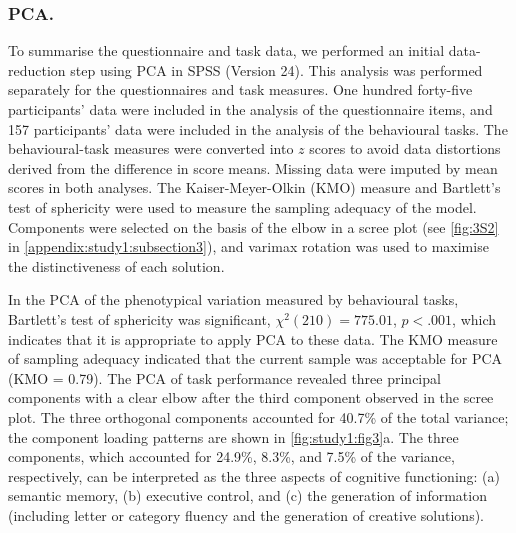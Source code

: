 \subsubsection{PCA.}
To summarise the questionnaire and task data, we performed an initial data-reduction step using PCA in SPSS (Version 24). This analysis was performed separately for the questionnaires and task measures. One hundred forty-five participants’ data were included in the analysis of the questionnaire items, and 157 participants’ data were included in the analysis of the behavioural tasks. The behavioural-task measures were converted into \(\mathit{z}\) scores to avoid data distortions derived from the difference in score means. Missing data were imputed by mean scores in both analyses. The Kaiser-Meyer-Olkin (KMO) measure and Bartlett’s test of sphericity were used to measure the sampling adequacy of the model. Components were selected on the basis of the elbow in a scree plot (see \cref{fig:3S2} in \cref{appendix:study1:subsection3}), and varimax rotation was used to maximise the distinctiveness of each solution.

In the PCA of the phenotypical variation measured by behavioural tasks, Bartlett’s test of sphericity was significant,
\(\chi^{2}(210) = 775.01\),
\(\mathit{p} < .001\),
which indicates that it is appropriate to apply PCA to these data. The KMO measure of sampling adequacy indicated that the current sample was acceptable for PCA (KMO = 0.79). The PCA of task performance revealed three principal components with a clear elbow after the third component observed in the scree plot. The three orthogonal components accounted for 40.7\% of the total variance; the component loading patterns are shown in \cref{fig:study1:fig3}a. The three components, which accounted for 24.9\%, 8.3\%, and 7.5\% of the variance, respectively, can be interpreted as the three aspects of cognitive functioning: (a) semantic memory, (b) executive control, and (c) the generation of information (including letter or category fluency and the generation of creative solutions).

